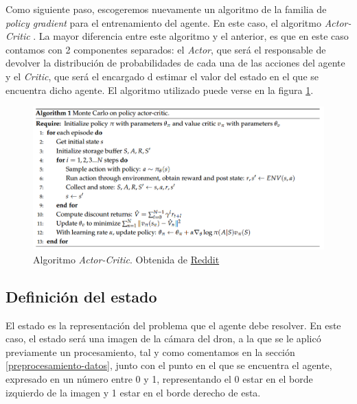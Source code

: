 Como siguiente paso, escogeremos nuevamente un algoritmo de la familia de \textit{policy gradient} para el entrenamiento del agente. En este caso, el algoritmo \textit{Actor-Critic} \citep{DBLP:journals/corr/abs-1801-01290}. La mayor diferencia entre este algoritmo y el anterior, es que en este caso contamos con 2 componentes separados: el \textit{Actor}, que será el responsable de devolver la distribución de probabilidades de cada una de las acciones del agente y el \textit{Critic}, que será el encargado d estimar el valor del estado en el que se encuentra dicho agente. El algoritmo utilizado puede verse en la figura \ref{fig-algoritmo-actor-critic}.
\medskip

\begin{figure}[ht!]
	\centering
	\includegraphics[width=1\linewidth]{figuras/algoritmo_actor_critic.png}
	\caption[Algoritmo \textit{Actor-Critic}]{Algoritmo \textit{Actor-Critic}. Obtenida de \href{https://preview.redd.it/6dfwcx17zwi21.png?width=971&format=png&auto=webp&s=e1f13781cf1b436425b8e7e802fc24b6a6951e8e}{Reddit}}
	\label{fig-algoritmo-actor-critic}
\end{figure}

\subsection{Definición del estado}
\label{definicion-del-estado}

El estado es la representación del problema que el agente debe resolver. En este caso, el estado será una imagen de la cámara del dron, a la que se le aplicó previamente un procesamiento, tal y como comentamos en la sección \ref{preprocesamiento-datos}, junto con el punto en el que se encuentra el agente, expresado en un número entre 0 y 1, representando el 0 estar en el borde izquierdo de la imagen y 1 estar en el borde derecho de esta.
\medskip

